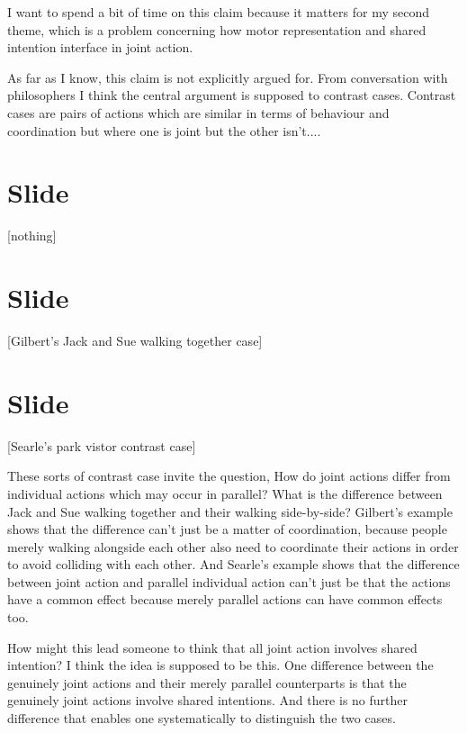 \documentclass[12pt,\papersize]{extarticle}
\begin{document}
I want to spend a bit of time on this claim because it matters for my second theme, which is a problem concerning how motor representation and shared intention interface in joint action.

As far as I know, this claim is not explicitly argued for.  From conversation with philosophers I think the central argument is supposed to contrast cases.
Contrast cases are pairs of actions which are similar in terms of behaviour and coordination but where one is joint but the other isn’t....



\section{Slide}
[nothing]


\section{Slide}
[Gilbert's Jack and Sue walking together case]


\section{Slide}
[Searle's park vistor contrast case]

These sorts of contrast case invite the question, 
How do joint actions differ from individual actions which may occur in parallel? 
What is the difference between Jack and Sue walking together and their walking side-by-side?  
Gilbert’s example shows that the difference can’t just be a matter of coordination, because people merely walking alongside each other also need to coordinate their actions in order to avoid colliding with each other.  
And Searle’s example shows that the difference between joint action and parallel individual action can’t just be that the actions have a common effect because merely parallel actions can have common effects too. 

How might this lead someone to think that all joint action involves shared intention?
I think the idea is supposed to be this.
One difference between the genuinely joint actions and their merely parallel counterparts is that the genuinely joint actions involve shared intentions.
And there is no further difference that enables one systematically to distinguish the two cases.
\end{document}
